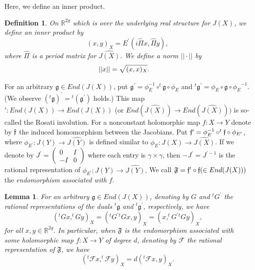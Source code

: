 \documentclass[11pt]{article}
\numberwithin{equation}{section}
\theoremstyle{plain}
\newtheorem{lemma}[theorem]{Lemma}
\newtheorem{definition}[theorem]{Definition}
\begin{document}
 Here, we define an inner product. 

\begin{definition}
On $\mathbb{R}^{2g}$ which is over the underlying real structure for $J(X)$, we define an inner product by 
\begin{equation*}
(x,y)_{X}=E^{\prime}(i \widehat{\Pi}x, \widehat{\Pi}y),
\end{equation*}
where $ \widehat{\Pi}$ is a period matrix for $ \widehat{J(X)}$. We define a norm $|| \cdot ||$ by 
\begin{equation*}
||x||=\sqrt{(x,x)_{X}}. \text{\quad }
\end{equation*}
\end{definition}

For an arbitrary $\mathfrak{g}\in End(J(X))$, put $\mathfrak{g^{\prime}}=\phi_{E}^{-1}\circ^{t}\mathfrak{g}\circ\phi_{E}$ and ${}^t \mathfrak{g}^{\prime}=\phi_{E}\circ\mathfrak{g}\circ{\phi_{E}}^{-1}.$ (We observe $(^{t}\mathfrak{g})^{\prime}={^{t}(\mathfrak{g^{\prime}})}$ holds.) This map $': End(J(X))\rightarrow End(J(X))$ (or $End( \widehat{J(X)})\rightarrow End( \widehat{J(X)}))$ is so-called the Rosati involution.  For a nonconstant holomorphic map $f:X\rightarrow Y$ denote by $\frak{f}$ the induced homomorphism between the Jacobians.  Put $\frak{f}^{\prime}=\phi_{E}^{-1}\circ^{t}\frak{f}\circ\phi_{E^{\prime}}$, where $\phi_{E^{\prime}}:J(Y)\rightarrow \widehat{J(Y)}$ is defined similar  to $\phi_{E}:J(X)\rightarrow \widehat{J(X)}$. If we denote by $J^{\prime}=\begin{pmatrix}0&I\\ -I&0\end{pmatrix}$ where each entry is $\gamma\times\gamma$, then $-J^{\prime}=J^{\prime -1}$ is the rational representation of $\phi_{E^{\prime}}:J(Y)\rightarrow \widehat{J(Y)}.$ We call $\mathfrak{F}=\frak{f}^{\prime}\circ \frak{f}(\in End(J(X)))$ the {\it endomorphism associated with} $f$. 

\vspace{0.2cm}
\begin{lemma}\label{lem1} For an arbitrary $\mathfrak{g}\in End(J(X))$, denoting by $G$ and $^{t}G^{\prime}$ the rational representations of the duals $^{t}\mathfrak{g}$ and $^{t}\mathfrak{g^{\prime}}$, respectively, we have
\begin{equation}
(^{t}Gx,^{t}Gy)_{X}=(^{t}G^{\prime}{^{t}Gx},y)_{X}=(x,^{t}G^{\prime}{^{t}Gy})_{X}, 
\end{equation}
for all $x, y\in\mathbb{R}^{2g}.$ In particular, when $\mathfrak{F}$ is the endomorphism associated with some holomorphic map $f:X\rightarrow Y$ of degree $d$, denoting by $\mathcal{F}$ the rational representation of $\mathfrak{F}$, we have
\begin{equation}
(^{t}\mathcal{F}x,^{t}\mathcal{F}y)_{X}=d(^{t}\mathcal{F}x,y)_{X}. 
\end{equation}
\end{lemma}
\end{document}
